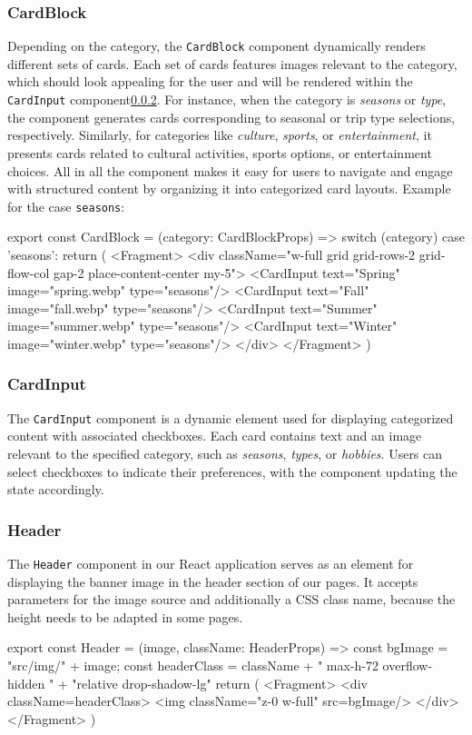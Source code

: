 \documentclass[english,notitlepage,smartquotes]{hgbreport}
\begin{document}
\subsubsection{CardBlock} \label{CardBlockComponent}
Depending on the category, the \texttt{CardBlock} component dynamically renders different sets of cards. Each set of cards features images relevant to the category, which should look appealing for the user and will be rendered within the \texttt{CardInput} component\ref{CardInput}. For instance, when the category is \textit{seasons} or \textit{type}, the component generates cards corresponding to seasonal or trip type selections, respectively. Similarly, for categories like \textit{culture}, \textit{sports}, or \textit{entertainment}, it presents cards related to cultural activities, sports options, or entertainment choices. All in all the component makes it easy for users to navigate and engage with structured content by organizing it into categorized card layouts. Example for the case \texttt{seasons}:
\begin{JsCode}
export const CardBlock = ({category}: CardBlockProps) => {
	switch (category) {
		case 'seasons':
		return (
			<Fragment>
				<div className="w-full grid grid-rows-2 grid-flow-col gap-2
				place-content-center my-5">
				   <CardInput text="Spring" image="spring.webp" type="seasons"/>
				   <CardInput text="Fall" image="fall.webp" type="seasons"/>
				   <CardInput text="Summer" image="summer.webp" type="seasons"/>
				   <CardInput text="Winter" image="winter.webp" type="seasons"/>
				</div>
			</Fragment>
		)
	}
}
\end{JsCode}

\subsubsection{CardInput} \label{CardInput}
The \texttt{CardInput} component is a dynamic element used for displaying categorized content with associated checkboxes. Each card contains text and an image relevant to the specified category, such as \textit{seasons}, \textit{types}, or \textit{hobbies}. Users can select checkboxes to indicate their preferences, with the component updating the state accordingly.

\subsubsection{Header}
The \texttt{Header} component in our React application serves as an element for displaying the banner image in the header section of our pages. It accepts parameters for the image source and additionally a CSS class name, because the height needs to be adapted in some pages.
\begin{JsCode}
	export const Header = ({image, className}: HeaderProps) => {
		const bgImage = "src/img/" + image;
		const headerClass = className + " max-h-72 overflow-hidden " +
			"relative drop-shadow-lg"
		return (
			<Fragment>
				<div className={headerClass}>
					<img className="z-0 w-full" src={bgImage}/>
				</div>
			</Fragment>
		)
	}
\end{JsCode}
\end{document}
